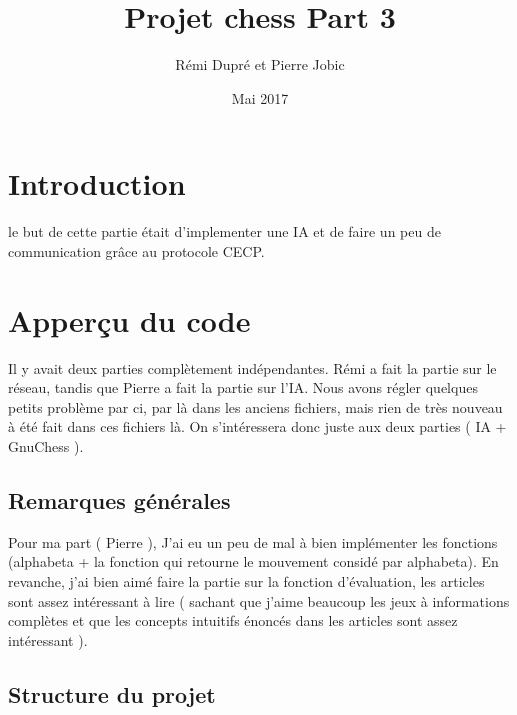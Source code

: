 \documentclass{article}
\title{Projet chess Part 3}
\author{Rémi Dupré et Pierre Jobic }
\date{Mai 2017}
\begin{document}
\maketitle

\section{Introduction}

le but de cette partie était d'implementer une IA et de faire un peu de communication grâce au protocole CECP.


\section{Apperçu du code}
Il y avait deux parties complètement indépendantes. Rémi a fait la partie sur le réseau, tandis que Pierre a fait la partie sur l'IA.
Nous avons régler quelques petits problème par ci, par là dans les anciens fichiers, mais rien de très nouveau à été fait dans ces fichiers là. On s'intéressera donc juste aux deux parties ( IA + GnuChess ).

\subsection{Remarques générales}

Pour ma part ( Pierre ), J'ai eu un peu de mal à bien implémenter les fonctions (alphabeta + la fonction qui retourne le mouvement considé par alphabeta). En revanche, j'ai bien aimé faire la partie sur la fonction d'évaluation, les articles sont assez intéressant à lire ( sachant que j'aime beaucoup les jeux à informations complètes et que les concepts intuitifs énoncés dans les articles sont assez intéressant ).

\subsection{Structure du projet}
\end{document}
